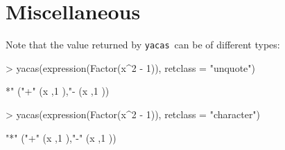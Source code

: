 \documentclass[]{article}
\newcommand{\yacas}{{\tt yacas}}
\begin{document}
\section{Miscellaneous} 
\label{sec:misc}



Note that the value returned by \yacas\ can be of different types:
\begin{Schunk}
\begin{Sinput}
> yacas(expression(Factor(x^2 - 1)), retclass = "unquote")
\end{Sinput}
\begin{Soutput}
*" ("+" (x ,1 ),"- (x ,1 ))
\end{Soutput}
\begin{Sinput}
> yacas(expression(Factor(x^2 - 1)), retclass = "character")
\end{Sinput}
\begin{Soutput}
"*" ("+" (x ,1 ),"-" (x ,1 ))
\end{Soutput}
\end{Schunk}
\end{document}
